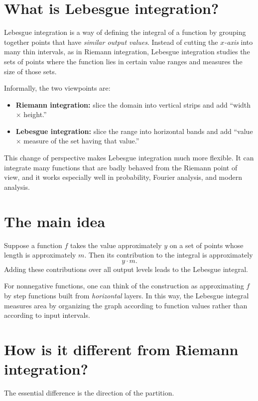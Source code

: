 \section*{What is Lebesgue integration?}

Lebesgue integration is a way of defining the integral of a function by grouping together points that have \emph{similar output values}. Instead of cutting the \emph{$x$-axis} into many thin intervals, as in Riemann integration, Lebesgue integration studies the sets of points where the function lies in certain value ranges and measures the size of those sets.

Informally, the two viewpoints are:
\begin{itemize}[leftmargin=1.5em]
    \item \textbf{Riemann integration:} slice the domain into vertical strips and add ``width $\times$ height.''
    \item \textbf{Lebesgue integration:} slice the range into horizontal bands and add ``value $\times$ measure of the set having that value.''
\end{itemize}

This change of perspective makes Lebesgue integration much more flexible. It can integrate many functions that are badly behaved from the Riemann point of view, and it works especially well in probability, Fourier analysis, and modern analysis.

\section*{The main idea}

Suppose a function $f$ takes the value approximately $y$ on a set of points whose length is approximately $m$. Then its contribution to the integral is approximately
\[
y \cdot m.
\]
Adding these contributions over all output levels leads to the Lebesgue integral.

For nonnegative functions, one can think of the construction as approximating $f$ by step functions built from \emph{horizontal} layers. In this way, the Lebesgue integral measures area by organizing the graph according to function values rather than according to input intervals.

\section*{How is it different from Riemann integration?}

The essential difference is the direction of the partition.

